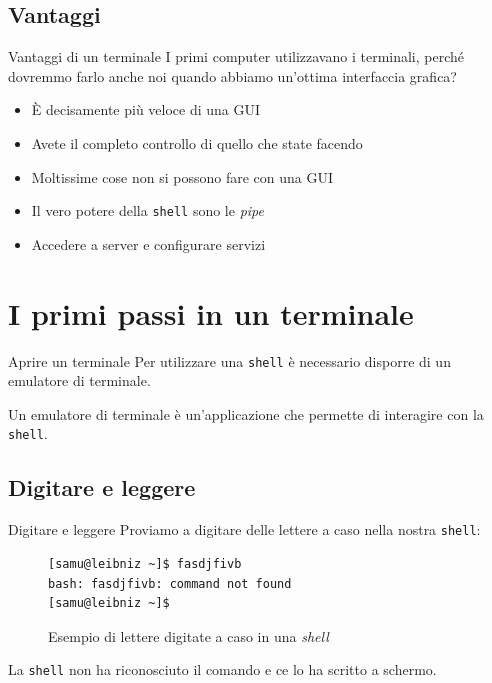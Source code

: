 \documentclass{beamer}
\begin{document}
\subsection{Vantaggi}
\begin{frame}{Vantaggi di un terminale}
  I primi computer utilizzavano i terminali, perché dovremmo farlo anche noi
  quando abbiamo un'ottima interfaccia grafica?\bigskip

  \begin{itemize}
    \item <1-> È decisamente più veloce di una GUI
    \item <2-> Avete il completo controllo di quello che state facendo
    \item <3-> Moltissime cose non si possono fare con una GUI
    \item <4-> Il vero potere della \texttt{shell} sono le \textit{pipe}
    \item <5-> Accedere a server e configurare servizi
  \end{itemize}
\end{frame}

\section{I primi passi in un terminale}
\begin{frame}{Aprire un terminale}
  Per utilizzare una \texttt{shell} è necessario disporre di un emulatore di 
  terminale.\bigskip

  Un emulatore di terminale è un'applicazione che permette di interagire con
  la \texttt{shell}.
\end{frame}

\subsection{Digitare e leggere}
\begin{frame}[fragile]{Digitare e leggere}
  Proviamo a digitare delle lettere a caso nella nostra \texttt{shell}:
  \begin{figure}
    \begin{lstlisting}
[samu@leibniz ~]$ fasdjfivb
bash: fasdjfivb: command not found
[samu@leibniz ~]$ 
    \end{lstlisting}
    \caption{Esempio di lettere digitate a caso in una \textit{shell}}
  \end{figure}
  \pause
  La \texttt{shell} non ha riconosciuto il comando e ce lo ha scritto a schermo.
\end{frame}
\end{document}
